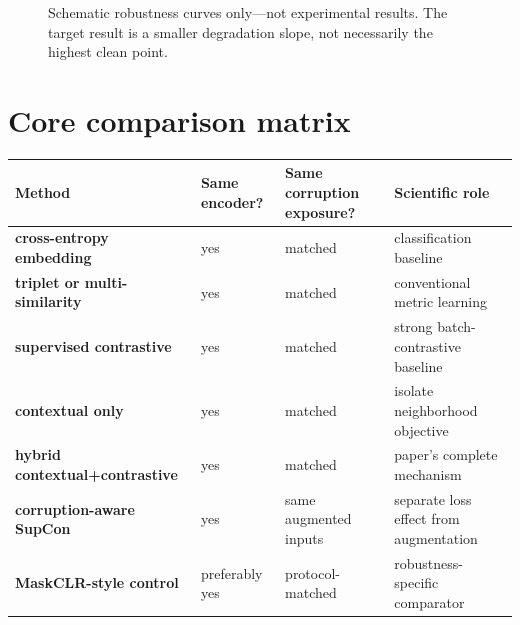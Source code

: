 \documentclass[11pt,oneside,openany]{book}
\theoremstyle{myplain}
\theoremstyle{definition}
\begin{document}
\begin{figure}[H]
\centering
{}
\caption{Schematic robustness curves only---not experimental results. The target result is a smaller degradation slope, not necessarily the highest clean point.}
\label{fig:robustness-schematic}
\end{figure}

\section{Core comparison matrix}

\begin{center}
\begin{tabularx}{\textwidth}{>{\bfseries}l X X X}
\toprule
Method & Same encoder? & Same corruption exposure? & Scientific role \\
\midrule
cross-entropy embedding & yes & matched & classification baseline \\
triplet or multi-similarity & yes & matched & conventional metric learning \\
supervised contrastive & yes & matched & strong batch-contrastive baseline \\
contextual only & yes & matched & isolate neighborhood objective \\
hybrid contextual+contrastive & yes & matched & paper's complete mechanism \\
corruption-aware SupCon & yes & same augmented inputs & separate loss effect from augmentation \\
MaskCLR-style control & preferably yes & protocol-matched & robustness-specific comparator \\
\bottomrule
\end{tabularx}
\end{center}
\end{document}
